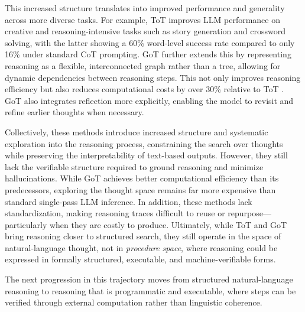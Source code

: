 \documentclass[project]{bsu-cs}  %
\begin{document}
This increased structure translates into improved performance and generality across more diverse tasks. For example, ToT improves LLM performance on creative and reasoning-intensive tasks such as story generation and crossword solving, with the latter showing a 60\% word-level success rate compared to only 16\% under standard CoT prompting. GoT further extends this by representing reasoning as a flexible, interconnected graph rather than a tree, allowing for dynamic dependencies between reasoning steps. This not only improves reasoning efficiency but also reduces computational costs by over 30\% relative to ToT \citep{Besta_2024}. GoT also integrates reflection more explicitly, enabling the model to revisit and refine earlier thoughts when necessary.

Collectively, these methods introduce increased structure and systematic exploration into the reasoning process, constraining the search over thoughts while preserving the interpretability of text-based outputs. However, they still lack the verifiable structure required to ground reasoning and minimize hallucinations. While GoT achieves better computational efficiency than its predecessors, exploring the thought space remains far more expensive than standard single-pass LLM inference. In addition, these methods lack standardization, making reasoning traces difficult to reuse or repurpose—particularly when they are costly to produce. Ultimately, while ToT and GoT bring reasoning closer to structured search, they still operate in the space of natural-language thought, not in \textit{procedure space}, where reasoning could be expressed in formally structured, executable, and machine-verifiable forms.

The next progression in this trajectory moves from structured natural-language reasoning to reasoning that is programmatic and executable, where steps can be verified through external computation rather than linguistic coherence.
% 
%
%
% 
\end{document}
